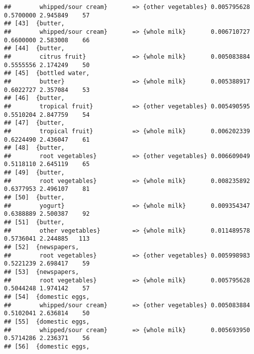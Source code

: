 \documentclass[]{article}
\begin{document}
\begin{verbatim}
##        whipped/sour cream}       => {other vegetables} 0.005795628  0.5700000 2.945849    57
## [43]  {butter,                                                                              
##        whipped/sour cream}       => {whole milk}       0.006710727  0.6600000 2.583008    66
## [44]  {butter,                                                                              
##        citrus fruit}             => {whole milk}       0.005083884  0.5555556 2.174249    50
## [45]  {bottled water,                                                                       
##        butter}                   => {whole milk}       0.005388917  0.6022727 2.357084    53
## [46]  {butter,                                                                              
##        tropical fruit}           => {other vegetables} 0.005490595  0.5510204 2.847759    54
## [47]  {butter,                                                                              
##        tropical fruit}           => {whole milk}       0.006202339  0.6224490 2.436047    61
## [48]  {butter,                                                                              
##        root vegetables}          => {other vegetables} 0.006609049  0.5118110 2.645119    65
## [49]  {butter,                                                                              
##        root vegetables}          => {whole milk}       0.008235892  0.6377953 2.496107    81
## [50]  {butter,                                                                              
##        yogurt}                   => {whole milk}       0.009354347  0.6388889 2.500387    92
## [51]  {butter,                                                                              
##        other vegetables}         => {whole milk}       0.011489578  0.5736041 2.244885   113
## [52]  {newspapers,                                                                          
##        root vegetables}          => {other vegetables} 0.005998983  0.5221239 2.698417    59
## [53]  {newspapers,                                                                          
##        root vegetables}          => {whole milk}       0.005795628  0.5044248 1.974142    57
## [54]  {domestic eggs,                                                                       
##        whipped/sour cream}       => {other vegetables} 0.005083884  0.5102041 2.636814    50
## [55]  {domestic eggs,                                                                       
##        whipped/sour cream}       => {whole milk}       0.005693950  0.5714286 2.236371    56
## [56]  {domestic eggs,                                                                       

\end{verbatim}
\end{document}
